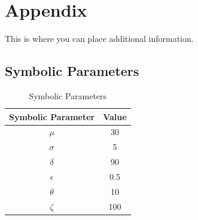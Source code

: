 \documentclass[12pt, titlepage]{article}
\begin{document}
					
					
					
					

					
					
					
					







				
% 

% 

\newpage

\section{Appendix}

This is where you can place additional information.

\subsection{Symbolic Parameters}

\begin{table}[H]
    \centering
    \begin{tabular}{|c|c|}
    \hline
        Symbolic Parameter & Value \\ \hline
        $\mu$ & 30 \\
        $\sigma$ & 5  \\
        $\delta$ & 90  \\
        $\epsilon$ & 0.5 \\
        $\theta$ & 10 \\
        $\zeta$ & 100 \\
         \hline
    \end{tabular}
    \caption{Symbolic Parameters}
    \label{tab:my_label}
\end{table}
\end{document}
